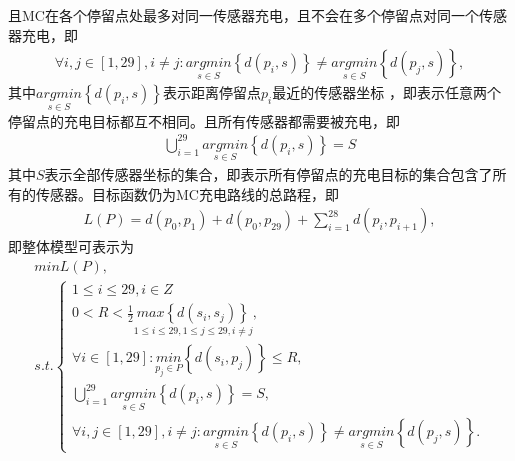 \documentclass{whutmod}
\begin{document}
	且MC在各个停留点处最多对同一传感器充电，且不会在多个停留点对同一个传感器充电，即
		\begin{gather}
		\forall i,j\in[1,29], i\neq j:  \underset{s\in S}{argmin}\left \{ d(p_i,s) \right \} \neq \underset{s\in S}{argmin}\left \{ d(p_j,s) \right \},
		\end{gather}
		其中$\underset{s\in S}{argmin}\left \{ d(p_i,s) \right \}$表示距离停留点$p_i$最近的传感器坐标 ，即表示任意两个停留点的充电目标都互不相同。且所有传感器都需要被充电，即
		\begin{gather}
		\bigcup_{i=1}^{29} \underset{s\in S}{argmin}\left \{ d(p_i,s) \right \}=S
		\end{gather}
			其中$S$表示全部传感器坐标的集合，即表示所有停留点的充电目标的集合包含了所有的传感器。目标函数仍为MC充电路线的总路程，即
		\begin{gather*}
		L(P)=d(p_0,p_{1})+d(p_0,p_{29})+\sum_{i=1}^{28}d(p_i,p_{i+1}) ,
		\end{gather*}
		即整体模型可表示为
		\begin{gather}
		min L(P) ,\\
	s.t.	\left\{\begin{matrix}1\leqslant i \leqslant 29 ,i\in Z
	\\0<R<\frac{1}{2}\underset{1\leqslant i\leqslant 29,1\leqslant j\leqslant 29,i\neq j}{max\left \{ d(s_i,s_j) \right \}},
		\\ 	\forall i\in[1,29]:   \underset{p_j\in P}{min}\left \{ d(s_i,p_j) \right \}\leqslant R,
		\\\bigcup_{i=1}^{29} \underset{s\in S}{argmin}\left \{ d(p_i,s) \right \}=S,
		\\\forall i,j\in[1,29], i\neq j:  \underset{s\in S}{argmin}\left \{ d(p_i,s) \right \} \neq \underset{s\in S}{argmin}\left \{ d(p_j,s) \right \}.
		\end{matrix}\right.
		\end{gather}
		
\end{document}
